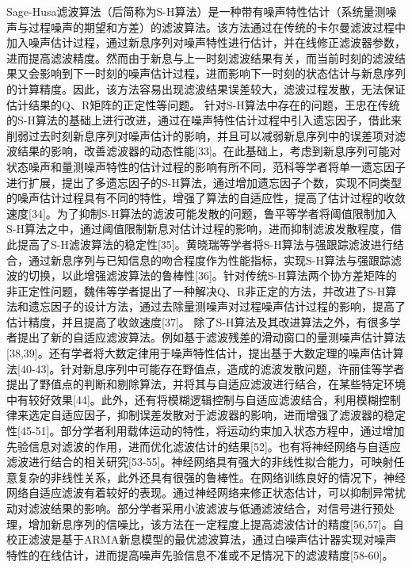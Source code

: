 Sage-Husa滤波算法（后简称为S-H算法）是一种带有噪声特性估计（系统量测噪声与过程噪声的期望和方差）的滤波算法。该方法通过在传统的卡尔曼滤波过程中加入噪声估计过程，通过新息序列对噪声特性进行估计，并在线修正滤波器参数，进而提高滤波精度。然而由于新息与上一时刻滤波结果有关，而当前时刻的滤波结果又会影响到下一时刻的噪声估计过程，进而影响下一时刻的状态估计与新息序列的计算精度。因此，该方法容易出现滤波结果误差较大，滤波过程发散，无法保证估计结果的Q、R矩阵的正定性等问题。
针对S-H算法中存在的问题，王忠在传统的S-H算法的基础上进行改进，通过在噪声特性估计过程中引入遗忘因子，借此来削弱过去时刻新息序列对噪声估计的影响，并且可以减弱新息序列中的误差项对滤波结果的影响，改善滤波器的动态性能[33]。在此基础上，考虑到新息序列可能对状态噪声和量测噪声特性的估计过程的影响有所不同，范科等学者将单一遗忘因子进行扩展，提出了多遗忘因子的S-H算法，通过增加遗忘因子个数，实现不同类型的噪声估计过程具有不同的特性，增强了算法的自适应性，提高了估计过程的收敛速度[34]。为了抑制S-H算法的滤波可能发散的问题，鲁平等学者将阈值限制加入S-H算法之中，通过阈值限制新息对估计过程的影响，进而抑制滤波发散程度，借此提高了S-H滤波算法的稳定性[35]。黄晓瑞等学者将S-H算法与强跟踪滤波进行结合，通过新息序列与已知信息的吻合程度作为性能指标，实现S-H算法与强跟踪滤波的切换，以此增强滤波算法的鲁棒性[36]。针对传统S-H算法两个协方差矩阵的非正定性问题，魏伟等学者提出了一种解决Q、R非正定的方法，并改进了S-H算法和遗忘因子的设计方法，通过去除量测噪声对过程噪声估计过程的影响，提高了估计精度，并且提高了收敛速度[37]。
除了S-H算法及其改进算法之外，有很多学者提出了新的自适应滤波算法。例如基于滤波残差的滑动窗口的量测噪声估计算法[38,39]。还有学者将大数定律用于噪声特性估计，提出基于大数定理的噪声估计算法[40-43]。针对新息序列中可能存在野值点，造成的滤波发散问题，许丽佳等学者提出了野值点的判断和剔除算法，并将其与自适应滤波进行结合，在某些特定环境中有较好效果[44]。此外，还有将模糊逻辑控制与自适应滤波结合，利用模糊控制律来选定自适应因子，抑制误差发散对于滤波器的影响，进而增强了滤波器的稳定性[45-51]。部分学者利用载体运动的特性，将运动约束加入状态方程中，通过增加先验信息对滤波的作用，进而优化滤波估计的结果[52]。也有将神经网络与自适应滤波进行结合的相关研究[53-55]。神经网络具有强大的非线性拟合能力，可映射任意复杂的非线性关系，此外还具有很强的鲁棒性。在网络训练良好的情况下，神经网络自适应滤波有着较好的表现。通过神经网络来修正状态估计，可以抑制异常扰动对滤波结果的影响。部分学者采用小波滤波与低通滤波结合，对信号进行预处理，增加新息序列的信噪比，该方法在一定程度上提高滤波估计的精度[56,57]。自校正滤波是基于ARMA新息模型的最优滤波算法，通过白噪声估计器实现对噪声特性的在线估计，进而提高噪声先验信息不准或不足情况下的滤波精度[58-60]。

